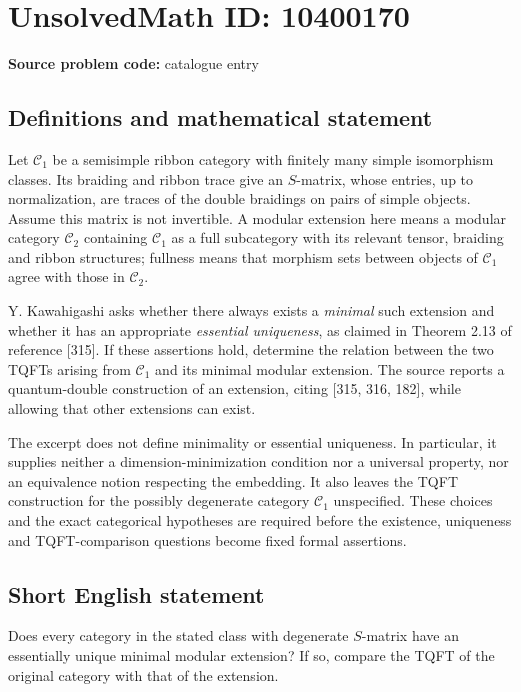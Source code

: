 \documentclass[11pt]{article}
\begin{document}
\section*{UnsolvedMath ID: 10400170}
\textbf{Source problem code:} catalogue entry
\subsection{Definitions and mathematical statement}
Let \(\mathcal C_1\) be a semisimple ribbon category with finitely many simple isomorphism classes. Its braiding and ribbon trace give an \(S\)-matrix, whose entries, up to normalization, are traces of the double braidings on pairs of simple objects. Assume this matrix is not invertible. A modular extension here means a modular category \(\mathcal C_2\) containing \(\mathcal C_1\) as a full subcategory with its relevant tensor, braiding and ribbon structures; fullness means that morphism sets between objects of \(\mathcal C_1\) agree with those in \(\mathcal C_2\).

Y. Kawahigashi asks whether there always exists a \emph{minimal} such extension and whether it has an appropriate \emph{essential uniqueness}, as claimed in Theorem 2.13 of reference [315]. If these assertions hold, determine the relation between the two TQFTs arising from \(\mathcal C_1\) and its minimal modular extension. The source reports a quantum-double construction of an extension, citing [315, 316, 182], while allowing that other extensions can exist.

The excerpt does not define minimality or essential uniqueness. In particular, it supplies neither a dimension-minimization condition nor a universal property, nor an equivalence notion respecting the embedding. It also leaves the TQFT construction for the possibly degenerate category \(\mathcal C_1\) unspecified. These choices and the exact categorical hypotheses are required before the existence, uniqueness and TQFT-comparison questions become fixed formal assertions.
\subsection{Short English statement}
Does every category in the stated class with degenerate \(S\)-matrix have an essentially unique minimal modular extension? If so, compare the TQFT of the original category with that of the extension.
\end{document}
